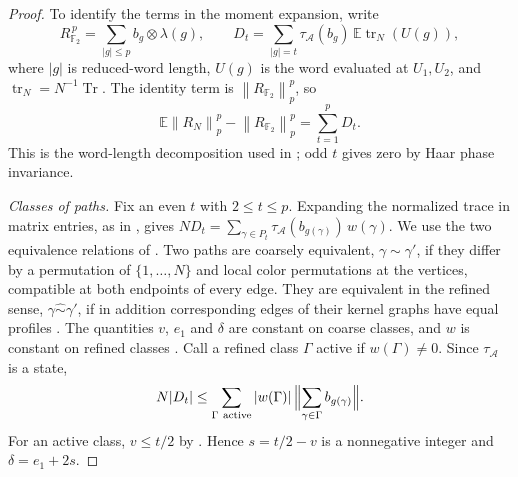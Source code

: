 \documentclass[11pt]{article}
\numberwithin{equation}{section}
\theoremstyle{boldremark}\newtheorem{remark}[theorem]{Remark}
\DeclareMathOperator{\Tr}{Tr}
\newcommand{\F}{\mathbb F}
\newcommand{\E}{\mathbb E}
\newcommand{\norm}[1]{\left\lVert #1\right\rVert}
\begin{document}
\begin{proof}
To identify the terms in the moment expansion, write
\[
 R_{\F_2}^{\,p}=\sum_{|g|\le p}b_g\otimes\lambda(g),
 \qquad
 D_t=\sum_{|g|=t}\tau_{\mathcal A}(b_g)\,
                \E\operatorname{tr}_N(U(g)),
\]
where $|g|$ is reduced-word length, $U(g)$ is the word evaluated
at $U_1,U_2$, and $\operatorname{tr}_N=N^{-1}\Tr$.
The identity term is $\norm{R_{\F_2}}_p^p$, so
\[
 \E\norm{R_N}_p^p-\norm{R_{\F_2}}_p^p=\sum_{t=1}^p D_t.
\]
This is the word-length decomposition used in
\cite[equation~(21)]{BC}; odd $t$ gives zero by Haar phase invariance.

\emph{Classes of paths.}
Fix an even $t$ with $2\le t\le p$. Expanding the normalized trace in
matrix entries, as in \cite[equations~(22)--(23)]{BC}, gives
$N D_t=\sum_{\gamma\in P_t}\tau_{\mathcal A}(b_{g(\gamma)})\,w(\gamma)$.
We use the two equivalence relations of \cite[Section~5.2]{BC}.
Two paths are coarsely equivalent, $\gamma\sim\gamma'$, if they differ
by a permutation of $\{1,\dots,N\}$ and local color permutations at
the vertices, compatible at both endpoints of every edge. They are
equivalent in the refined sense, $\gamma\mathrel{\hat\sim}\gamma'$, if
in addition corresponding edges of their kernel graphs have equal
profiles \cite[Definition~5.6]{BC}. The quantities $v$, $e_1$ and
$\delta$ are constant on coarse classes, and $w$ is constant on
refined classes \cite[Lemma~5.7]{BC}. Call a refined class $\Gamma$
active if $w(\Gamma)\ne0$. Since $\tau_{\mathcal A}$ is a state,
\begin{equation}
 N|D_t|\le\sum_{\Gamma\ \mathrm{active}}|w(\Gamma)|\,
 \Bigl\|\sum_{\gamma\in\Gamma}b_{g(\gamma)}\Bigr\|.
 \label{eq:class-sum}
\end{equation}
For an active class, $v\le t/2$ by \cite[Corollary~5.5]{BC}. Hence
$s=t/2-v$ is a nonnegative integer and $\delta=e_1+2s$.


\end{proof}
\end{document}
